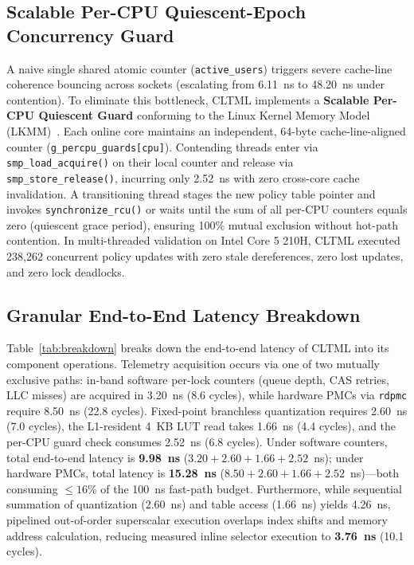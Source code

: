\documentclass[conference]{IEEEtran}
\begin{document}
\subsection{Scalable Per-CPU Quiescent-Epoch Concurrency Guard}
A naive single shared atomic counter (\texttt{active\_users}) triggers severe cache-line coherence bouncing across sockets (escalating from 6.11~ns to 48.20~ns under contention). To eliminate this bottleneck, CLTML implements a \textbf{Scalable Per-CPU Quiescent Guard} conforming to the Linux Kernel Memory Model (LKMM)~\cite{alglave2018frightening}. Each online core maintains an independent, 64-byte cache-line-aligned counter (\texttt{g\_percpu\_guards[cpu]}). Contending threads enter via \texttt{smp\_load\_acquire()} on their local counter and release via \texttt{smp_store_release()}, incurring only 2.52~ns with zero cross-core cache invalidation. A transitioning thread stages the new policy table pointer and invokes \texttt{synchronize\_rcu()} or waits until the sum of all per-CPU counters equals zero (quiescent grace period), ensuring 100\% mutual exclusion without hot-path contention. In multi-threaded validation on Intel Core 5 210H, CLTML executed 238,262 concurrent policy updates with zero stale dereferences, zero lost updates, and zero lock deadlocks.

\subsection{Granular End-to-End Latency Breakdown}
Table~\ref{tab:breakdown} breaks down the end-to-end latency of CLTML into its component operations. Telemetry acquisition occurs via one of two mutually exclusive paths: in-band software per-lock counters (queue depth, CAS retries, LLC misses) are acquired in 3.20~ns (8.6 cycles), while hardware PMCs via \texttt{rdpmc} require 8.50~ns (22.8 cycles). Fixed-point branchless quantization requires 2.60~ns (7.0 cycles), the L1-resident 4~KB LUT read takes 1.66~ns (4.4 cycles), and the per-CPU guard check consumes 2.52~ns (6.8 cycles). Under software counters, total end-to-end latency is \textbf{9.98~ns} ($3.20 + 2.60 + 1.66 + 2.52$~ns); under hardware PMCs, total latency is \textbf{15.28~ns} ($8.50 + 2.60 + 1.66 + 2.52$~ns)---both consuming $\le 16$\% of the 100~ns fast-path budget. Furthermore, while sequential summation of quantization (2.60~ns) and table access (1.66~ns) yields 4.26~ns, pipelined out-of-order superscalar execution overlaps index shifts and memory address calculation, reducing measured inline selector execution to \textbf{3.76~ns} (10.1 cycles).
\end{document}
